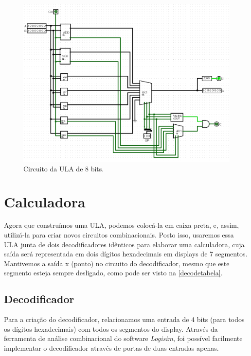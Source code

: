 \documentclass[
	12pt,				%
	openright,			%
	twoside,			%
	a4paper,			%
	english,			%
	french,				%
	spanish,			%
	brazil,				%
	]{abntex2}
\begin{document}
\begin{figure}[H]
	\begin{center}
	    \includegraphics[scale=0.38]{imagens/alu8.png}
	\end{center}
\caption{\label{ula8}Circuito da ULA de 8 bits.}
\end{figure}


\chapter{Calculadora}

Agora que construímos uma ULA, podemos colocá-la em caixa preta, e, assim, utilizá-la para criar novos circuitos combinacionais. Posto isso, usaremos essa ULA junta de dois decodificadores idênticos para elaborar uma calculadora, cuja saída será representada em dois dígitos hexadecimais em displays de 7 segmentos. Mantivemos a saída x (ponto) no circuito do decodificador, mesmo que este segmento esteja sempre desligado, como pode ser visto na \autoref{decodetabela}.

\section{Decodificador}
Para a criação do decodificador, relacionamos uma entrada de 4 bits (para todos os dígitos hexadecimais) com todos os segmentos do display. Através da ferramenta de análise combinacional do software \textit{Logisim}, foi possível facilmente implementar o decodificador através de portas de duas entradas apenas.
\end{document}
